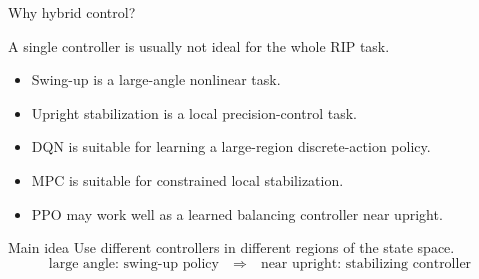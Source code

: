 \documentclass[aspectratio=169]{beamer}
\begin{document}
\begin{frame}{Why hybrid control?}

A single controller is usually not ideal for the whole RIP task.

\vspace{0.2cm}

\begin{itemize}
    \item Swing-up is a large-angle nonlinear task.
    \vspace{0.18cm}
    \item Upright stabilization is a local precision-control task.
    \vspace{0.18cm}
    \item DQN is suitable for learning a large-region discrete-action policy.
    \vspace{0.18cm}
    \item MPC is suitable for constrained local stabilization.
    \vspace{0.18cm}
    \item PPO may work well as a learned balancing controller near upright.
\end{itemize}

\vspace{0.2cm}

\begin{alertblock}{Main idea}
\small
Use different controllers in different regions of the state space.
\[
\text{large angle: swing-up policy}
\quad \Longrightarrow \quad
\text{near upright: stabilizing controller}
\]
\end{alertblock}

\end{frame}
\end{document}
